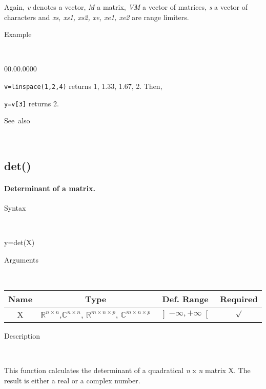 \begin{flushleft}Again, \textit{v} denotes a vector, \textit{M} a
matrix, \textit{VM} a vector of matrices, \textit{s} a vector of characters
and \textit{xs, xs1, xs2, xe, xe1, xe2} are range limiters.\end{flushleft}

\begin{description}
\item [Example]~
\end{description}
\begin{lyxlist}{00.00.0000}
\item [\texttt{v=linspace(1,2,4)}]returns 1, 1.33, 1.67, 2. Then,
\item [\texttt{y=v{[}3{]}}]returns 2.
\end{lyxlist}
\begin{description}
\item [See~also]~
\end{description}

\newpage
\subsection*{\hypertarget{det}{}{\Large det()}}


\paragraph{\textmd{\label{par:Determinant}}Determinant of a matrix.}

\begin{description}
\item [Syntax]~
\end{description}
y=det(X)

\begin{description}
\item [Arguments]~
\end{description}
\begin{tabular}{|c|c|c|c|}
\hline 
Name&
Type&
Def. Range&
Required\tabularnewline
\hline
\hline 
X&
$\mathbb{\mathbb{R}}^{n\times n}$,$\mathbb{\mathbb{C}}^{n\times n}$,
$\mathbb{\mathbb{R}}^{m\times n\times p}$, $\mathbb{\mathbb{C}}^{m\times n\times p}$ &
$\left]-\infty,+\infty\right[$&
$\surd$\tabularnewline
\hline
\end{tabular}

\begin{description}
\item [Description]~
\end{description}
This function calculates the determinant of a quadratical \textit{n}
x \textit{n} matrix X. The result is either a real or a complex number.

